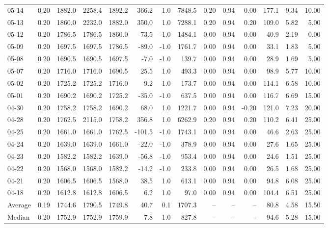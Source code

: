 \begin{threeparttable}
{\begin{tabular}{lrrrrrrrrrrrrr}
05-14 & 0.20 & 1882.0 & 2258.4 & 1892.2 & 366.2 & 1.0 & 7848.5 & 0.20 & 0.94 & 0.00 & 177.1 & 9.34 & 10.00 \\
05-13 & 0.20 & 1860.0 & 2232.0 & 1882.0 & 350.0 & 1.0 & 7288.1 & 0.20 & 0.94 & 0.20 & 109.0 & 5.82 & 5.00 \\
05-12 & 0.20 & 1786.5 & 1786.5 & 1860.0 & -73.5 & -1.0 & 1484.1 & 0.00 & 0.94 & 0.00 & 40.9 & 2.19 & 0.00 \\
05-09 & 0.20 & 1697.5 & 1697.5 & 1786.5 & -89.0 & -1.0 & 1761.7 & 0.00 & 0.94 & 0.00 & 33.1 & 1.83 & 5.00 \\
05-08 & 0.20 & 1690.5 & 1690.5 & 1697.5 & -7.0 & -1.0 & 139.7 & 0.00 & 0.94 & 0.00 & 28.9 & 1.69 & 5.00 \\
05-07 & 0.20 & 1716.0 & 1716.0 & 1690.5 & 25.5 & 1.0 & 493.3 & 0.00 & 0.94 & 0.00 & 98.9 & 5.77 & 10.00 \\
05-02 & 0.20 & 1725.2 & 1725.2 & 1716.0 & 9.2 & 1.0 & 173.7 & 0.00 & 0.94 & 0.00 & 114.1 & 6.58 & 10.00 \\
05-01 & 0.20 & 1690.2 & 1690.2 & 1725.2 & -35.0 & -1.0 & 637.5 & 0.00 & 0.94 & 0.00 & 116.7 & 6.69 & 15.00 \\
04-30 & 0.20 & 1758.2 & 1758.2 & 1690.2 & 68.0 & 1.0 & 1221.7 & 0.00 & 0.94 & -0.20 & 121.0 & 7.23 & 20.00 \\
04-28 & 0.20 & 1762.5 & 2115.0 & 1758.2 & 356.8 & 1.0 & 6262.9 & 0.20 & 0.94 & 0.20 & 110.2 & 6.41 & 25.00 \\
04-25 & 0.20 & 1661.0 & 1661.0 & 1762.5 & -101.5 & -1.0 & 1743.1 & 0.00 & 0.94 & 0.00 & 46.6 & 2.63 & 25.00 \\
04-24 & 0.20 & 1639.0 & 1639.0 & 1661.0 & -22.0 & -1.0 & 378.9 & 0.00 & 0.94 & 0.00 & 27.6 & 1.65 & 25.00 \\
04-23 & 0.20 & 1582.2 & 1582.2 & 1639.0 & -56.8 & -1.0 & 953.4 & 0.00 & 0.94 & 0.00 & 24.6 & 1.51 & 25.00 \\
04-22 & 0.20 & 1568.0 & 1568.0 & 1582.2 & -14.2 & -1.0 & 233.8 & 0.00 & 0.94 & 0.00 & 26.5 & 1.68 & 25.00 \\
04-21 & 0.20 & 1606.5 & 1606.5 & 1568.0 & 38.5 & 1.0 & 613.1 & 0.00 & 0.94 & 0.00 & 94.8 & 6.08 & 25.00 \\
04-18 & 0.20 & 1612.8 & 1612.8 & 1606.5 & 6.2 & 1.0 & 97.0 & 0.00 & 0.94 & 0.00 & 104.4 & 6.51 & 25.00 \\
Average & 0.19 & 1744.6 & 1790.5 & 1749.8 & 40.7 & 0.1 & 1707.3 & -- & -- & -- & 80.8 & 4.58 & 15.50 \\
Median & 0.20 & 1752.9 & 1752.9 & 1759.9 & 7.8 & 1.0 & 827.8 & -- & -- & -- & 94.6 & 5.28 & 15.00 \\

\end{tabular}}
\end{threeparttable}
